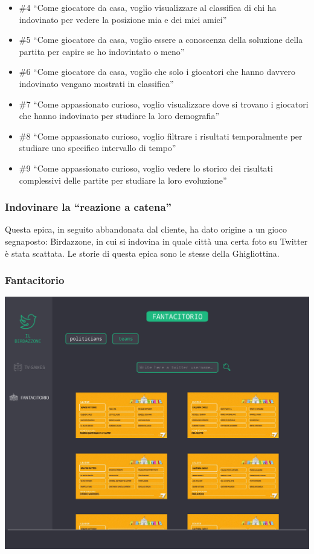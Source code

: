 \documentclass{article}
\begin{document}
\begin{itemize}
	\item \#4 ``Come giocatore da casa, voglio visualizzare al classifica di chi ha
	      indovinato per vedere la posizione mia e dei miei amici''
	\item \#5 ``Come giocatore da casa, voglio essere a conoscenza della soluzione
	      della partita per capire se ho indovintato o meno''
	\item \#6 ``Come giocatore da casa, voglio che solo i giocatori che hanno davvero
	      indovinato vengano mostrati in classifica''
	\item \#7 ``Come appassionato curioso, voglio visualizzare dove si trovano i
	      giocatori che hanno indovinato per studiare la loro demografia''
	\item \#8 ``Come appassionato curioso, voglio filtrare i risultati temporalmente
	      per studiare uno specifico intervallo di tempo''
	\item \#9 ``Come appassionato curioso, voglio vedere lo storico dei risultati
	      complessivi delle partite per studiare la loro evoluzione''
\end{itemize}

\subsubsection{Indovinare la ``reazione a catena''}

Questa epica, in seguito abbandonata dal cliente, ha dato origine a un gioco
segnaposto: Birdazzone, in cui si indovina in quale città una certa foto su
Twitter è stata scattata. Le storie di questa epica sono le stesse della
Ghigliottina.

\subsubsection{Fantacitorio}

\includegraphics[width=\textwidth]{mock-fantacitorio-teams.png}
\end{document}
